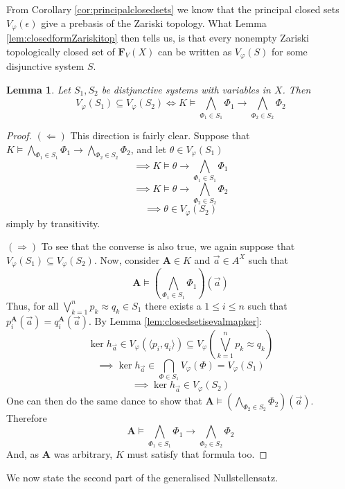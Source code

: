\documentclass{article}
\theoremstyle{plain}
\newtheorem{lemma}[theorem]{Lemma}
\theoremstyle{definition}
\begin{document}
From Corollary \ref{cor:principalclosedsets} we know that the principal closed sets $V_\varphi(\epsilon)$ give a prebasis of the Zariski topology.
What Lemma \ref{lem:closedformZariskitop} then tells us, is that every nonempty Zariski topologically closed set of $\mathbf{F}_V(X)$ can be written as $V_\varphi(S)$ for some disjunctive system $S$.



\begin{lemma} \label{lem:monotonicity}
    Let $S_1, S_2$ be distjunctive systems with variables in $X$.
    Then
    $$V_\varphi(S_1) \subseteq V_\varphi(S_2) \iff K \models \bigwedge_{\Phi_1  \in S_1} \Phi_1 \rightarrow \bigwedge_{\Phi_2 \in S_2} \Phi_2$$
\end{lemma}
\begin{proof}
    $(\Leftarrow)$
    This direction is fairly clear.
    Suppose that $K \models \bigwedge_{\Phi_1  \in S_1} \Phi_1 \rightarrow \bigwedge_{\Phi_2 \in S_2} \Phi_2$, and let $\theta\in V_\varphi(S_1)$
    $$\implies K\models \theta \rightarrow \bigwedge_{\Phi_1 \in  S_1} \Phi_1$$
    $$\implies K \models \theta \rightarrow \bigwedge_{\Phi_2\in S_2}\Phi_2$$
    $$\implies \theta \in V_\varphi(S_2)$$
    simply by transitivity.\par
    $(\Rightarrow)$
    To see that the converse is also true, we again suppose that $V_\varphi(S_1)\subseteq V_\varphi(S_2)$.
    Now, consider $\mathbf{A} \in K$ and $\vec{a} \in A^X$ such that
    $$\mathbf{A} \models (\bigwedge_{\Phi_1\in S_1}\Phi_1)(\vec{a})$$
    Thus, for all $\bigvee_{k=1}^n p_k\approx q_k \in S_1$ there exists a $1\leq i \leq n$ such that $p_i^\mathbf{A}(\vec{a}) = q^\mathbf{A}_i(\vec{a})$.
    By Lemma \ref{lem:closedsetisevalmapker}:
    $$\ker h_{\vec{a}} \in V_\varphi(\langle p_i, q_i\rangle) \subseteq V_\varphi(\bigvee_{k=1}^n p_k\approx q_k)$$
    $$\implies \ker h_{\vec{a}} \in \bigcap_{\Phi \in S_1} V_\varphi(\Phi) = V_\varphi(S_1)$$
    $$\implies \ker h_{\vec{a}} \in V_\varphi(S_2)$$
    One can then do the same dance to show  that $\mathbf{A} \models (\bigwedge_{\Phi_2 \in S_2} \Phi_2)(\vec{a})$.
    Therefore
    $$\mathbf{A}\models \bigwedge_{\Phi_1  \in S_1} \Phi_1 \rightarrow \bigwedge_{\Phi_2 \in S_2} \Phi_2$$
    And, as $\mathbf{A}$ was arbitrary, $K$ must satisfy that formula too.
\end{proof}

We now state the second part of the generalised Nullstellensatz.
\end{document}
